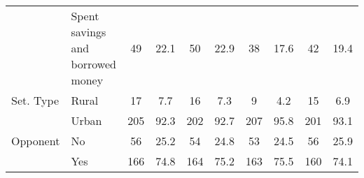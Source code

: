 \begin{table}[!htbp]
{\begin{tabular}[t]{llcccccccc}
 & Spent savings and
borrowed money & 49 & 22.1 & 50 & 22.9 & 38 & 17.6 & 42 & 19.4\\
Set. Type & Rural & 17 & 7.7 & 16 & 7.3 & 9 & 4.2 & 15 & 6.9\\
 & Urban & 205 & 92.3 & 202 & 92.7 & 207 & 95.8 & 201 & 93.1\\
Opponent & No & 56 & 25.2 & 54 & 24.8 & 53 & 24.5 & 56 & 25.9\\
 & Yes & 166 & 74.8 & 164 & 75.2 & 163 & 75.5 & 160 & 74.1\\
\bottomrule
\end{tabular}}
\end{table}
